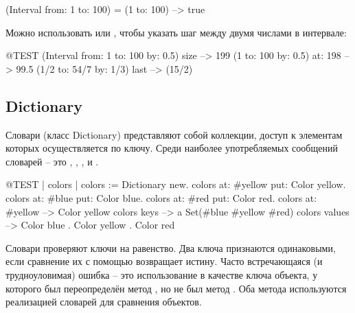 \documentclass[a4paper,10pt,twoside]{book}
\begin{document}
\begin{code}{}
(Interval from: 1 to: 100) = (1 to: 100) --> true
\end{code}

Можно использовать  или , чтобы указать шаг между двумя числами в интервале:

\begin{code}{@TEST}
(Interval from: 1 to: 100 by: 0.5) size --> 199
(1 to: 100 by: 0.5) at: 198 --> 99.5
(1/2 to: 54/7 by: 1/3) last --> (15/2)
\end{code}

\subsection{Dictionary}
Словари (класс Dictionary) представляют собой коллекции, доступ к элементам которых осуществляется по ключу.
Среди наиболее употребляемых сообщений словарей -- это , , ,  и .

\begin{code}{@TEST | colors |}
colors := Dictionary new.
colors at: #yellow put: Color yellow.
colors at: #blue put: Color blue.
colors at: #red put: Color red.
colors at: #yellow --> Color yellow
colors keys          --> a Set(#blue #yellow #red)
colors values       --> {Color blue . Color yellow . Color red}
\end{code}

Словари проверяют ключи на равенство. Два ключа признаются одинаковыми, если сравнение их с помощью \ct{=} возвращает истину. Часто встречающаяся (и трудноуловимая) ошибка -- это использование в качестве ключа объекта, у которого был переопределён метод \ct{=}, но не был метод . Оба метода используются реализацией словарей для сравнения объектов.
\end{document}
